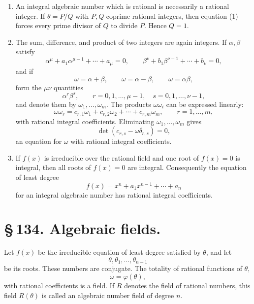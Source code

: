 \documentclass[11pt]{article}
\begin{document}
\begin{enumerate}[label=\arabic*.]
\item An integral algebraic number which is rational is necessarily a
rational integer. If \(\theta=P/Q\) with \(P,Q\) coprime rational
integers, then equation (1) forces every prime divisor of \(Q\) to
divide \(P\). Hence \(Q=1\).

\item The sum, difference, and product of two integers are again
integers. If \(\alpha,\beta\) satisfy
\[
\alpha^\mu+a_1\alpha^{\mu-1}+\cdots+a_\mu=0,\qquad
\beta^\nu+b_1\beta^{\nu-1}+\cdots+b_\nu=0,
\]
and if
\[
\omega=\alpha+\beta,\qquad \omega=\alpha-\beta,\qquad
\omega=\alpha\beta,
\]
form the \(\mu\nu\) quantities
\[
\alpha^r\beta^s,\qquad r=0,1,\ldots,\mu-1,\quad
s=0,1,\ldots,\nu-1,
\]
and denote them by \(\omega_1,\ldots,\omega_m\). The products
\(\omega\omega_i\) can be expressed linearly:
\begin{equation}
\omega\omega_r=c_{r,1}\omega_1+c_{r,2}\omega_2+\cdots+c_{r,m}\omega_m,
\qquad r=1,\ldots,m,
\tag{2}
\end{equation}
with rational integral coefficients. Eliminating
\(\omega_1,\ldots,\omega_m\) gives
\begin{equation}
\det(c_{r,s}-\omega\delta_{r,s})=0,
\tag{3}
\end{equation}
an equation for \(\omega\) with rational integral coefficients.

\item If \(f(x)\) is irreducible over the rational field and one root
of \(f(x)=0\) is integral, then all roots of \(f(x)=0\) are integral.
Consequently the equation of least degree
\begin{equation}
f(x)=x^n+a_1x^{n-1}+\cdots+a_n
\tag{4}
\end{equation}
for an integral algebraic number has rational integral coefficients.
\end{enumerate}

\section*{\S\,134. Algebraic fields.}

Let \(f(x)\) be the irreducible equation of least degree satisfied by
\(\theta\), and let
\[
\theta,\theta_1,\ldots,\theta_{n-1}
\]
be its roots. These numbers are conjugate. The totality of rational
functions of \(\theta\),
\[
\omega=\varphi(\theta),
\]
with rational coefficients is a field. If \(R\) denotes the field of
rational numbers, this field \(R(\theta)\) is called an algebraic
number field of degree \(n\).
\end{document}
